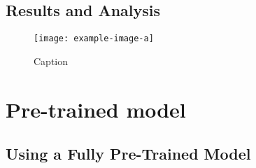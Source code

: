 

\subsection{Results and Analysis}

\begin{figure}[!hbt]
    \centering
    \texttt{[image: example-image-a]}
    \caption{Caption}
    \label{fig:my_label}
\end{figure}





\section{Pre-trained model}



\subsection{Using a Fully Pre-Trained Model}



